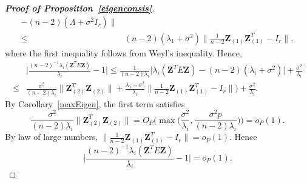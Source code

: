 \documentclass[review]{elsarticle}
\newcommand{\bZ}{\mathbf{Z}}
\theoremstyle{plain}
\theoremstyle{definition}
\theoremstyle{remark}
\begin{document}
\begin{proof}[\textbf{Proof of Proposition~\ref{eigenconsis}}]
{$$\begin{aligned}
        -(n-2)(\Lambda+\sigma^2 I_r)
        \|\\
        \leq &
        (n-2)(\lambda_1 + \sigma^2)\big\|\frac{1}{n-2}\bZ_{(1)}\bZ_{(1)}^T-I_r\big\|,
    \end{aligned}
    $$
    where the first inequality follows from Weyl's inequality.
    Hence,
        $$
        \begin{aligned}
            &\Big|\frac{(n-2)^{-1}\lambda_i(\bZ^T E \bZ)}{\lambda_i}-1\Big|
            \leq \frac{1}{(n-2)\lambda_i}\Big|\lambda_i(\bZ^T E \bZ)-(n-2)(\lambda_i+\sigma^2)\Big|+\frac{\sigma^2}{\lambda_i}\\
            \leq&\frac{\sigma^2}{(n-2)\lambda_i}\|\bZ_{(2)}^T \bZ_{(2)}\|+\frac{\lambda_1+\sigma^2}{\lambda_i}\big\|\frac{1}{n-2}\bZ_{(1)}\bZ_{(1)}^T-I_r\big\|\Big)+\frac{\sigma^2}{\lambda_i}.
        \end{aligned}
        $$
        By Corollary~\ref{maxEigen}, the first term satisfies
        $$
        \frac{\sigma^2}{(n-2)\lambda_i}\|\bZ_{(2)}^T \bZ_{(2)}\|
        =O_P\Big(\max\big(\frac{\sigma^2}{\lambda_i},\frac{\sigma^2 p}{(n-2)\lambda_i}\big)\Big)=o_P(1).
        $$
        By law of large numbers, $\big\|\frac{1}{n-2}\bZ_{(1)}\bZ_{(1)}^T-I_r\big\|=o_P(1)$. Hence
        $$
            \Big|\frac{(n-2)^{-1}\lambda_i(\bZ^T E \bZ)}{\lambda_i}-1\Big|=o_P(1).
        $$
}

\end{proof}
\end{document}
